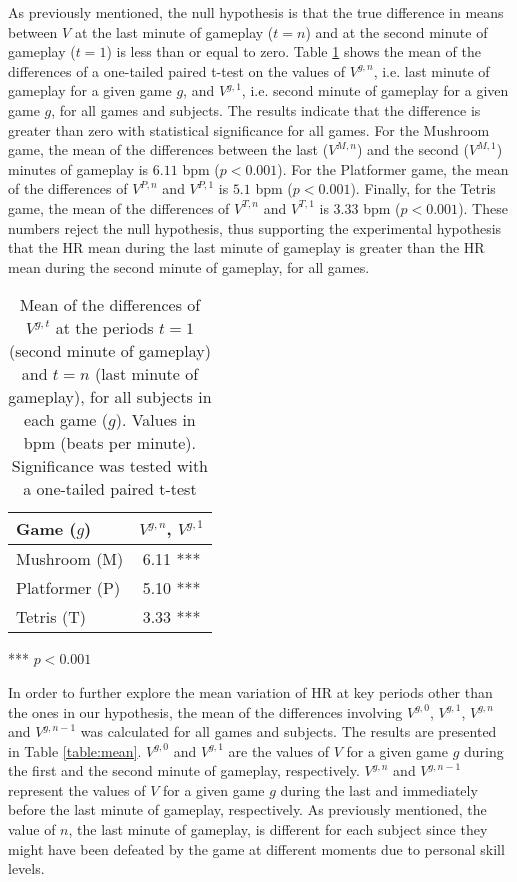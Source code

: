 As previously mentioned, the null hypothesis is that the true difference in means between $V$ at the last minute of gameplay ($t=n$) and at the second minute of gameplay ($t=1$) is less than or equal to zero. Table \ref{table:proof} shows the mean of the differences of a one-tailed paired t-test on the values of $V^{g,n}$, i.e. last minute of gameplay for a given game $g$, and $V^{g,1}$, i.e. second minute of gameplay for a given game $g$, for all games and subjects. The results indicate that the difference is greater than zero with statistical significance for all games. For the Mushroom game, the mean of the differences between the last ($V^{M,n}$) and the second ($V^{M,1}$) minutes of gameplay is $6.11$ bpm ($p < 0.001$). For the Platformer game, the mean of the differences of $V^{P,n}$ and $V^{P,1}$ is $5.1$ bpm ($p < 0.001$). Finally, for the Tetris game, the mean of the differences of $V^{T,n}$ and $V^{T,1}$ is $3.33$ bpm ($p < 0.001$). These numbers reject the null hypothesis, thus supporting the experimental hypothesis that the HR mean during the last minute of gameplay is greater than the HR mean during the second minute of gameplay, for all games.

\begin{table}
    \caption{Mean of the differences of $V^{g,t}$ at the periods $t=1$ (second minute of gameplay) and $t=n$ (last minute of gameplay), for all subjects in each game ($g$). Values in bpm (beats per minute). Significance was tested with a one-tailed paired t-test}
    \label{table:proof}
    \centering
  \begin{threeparttable}
     \begin{tabular}{lc}
        \toprule%
        \textbf{Game ($g$)} & \textbf{$V^{g,n}$, $V^{g,1}$} \\
        \midrule%
        Mushroom (M) & 6.11 ***  \\
        Platformer (P) & 5.10 ***  \\
        Tetris (T) & 3.33 *** \\
        \bottomrule%
     \end{tabular}
    \begin{tablenotes}
      \small
      \item[***]{$p < 0.001$}
    \end{tablenotes}
  \end{threeparttable}
\end{table}

In order to further explore the mean variation of HR at key periods other than the ones in our hypothesis, the mean of the differences involving $V^{g,0}$, $V^{g,1}$, $V^{g,n}$ and $V^{g,n-1}$ was calculated for all games and subjects. The results are presented in Table \ref{table:mean}. $V^{g,0}$ and $V^{g,1}$ are the values of $V$ for a given game $g$ during the first and the second minute of gameplay, respectively. $V^{g,n}$ and $V^{g,n-1}$ represent the values of $V$ for a given game $g$ during the last and immediately before the last minute of gameplay, respectively. As previously mentioned, the value of $n$, the last minute of gameplay, is different for each subject since they might have been defeated by the game at different moments due to personal skill levels.

